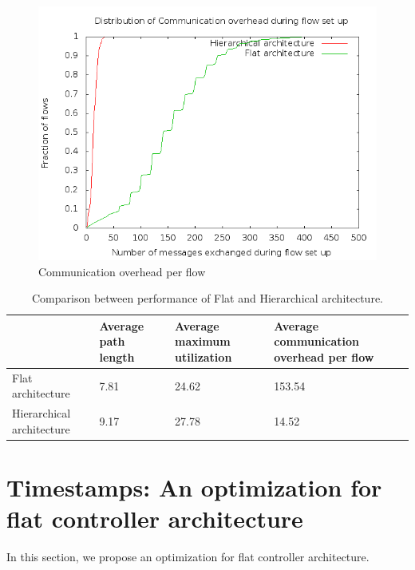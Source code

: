 \documentclass[10pt, twocolumn]{article}
\begin{document}
\begin{figure}[h]
\includegraphics[scale=0.3]{msg}
\caption{Communication overhead per flow}
\label{fig:msg}
\end{figure}


\begin{table}
\centering
\begin{tabular}{| L{4cm} | L{2cm} | L{3cm} | L{4cm} |}
\hline
& {Average path length} & {Average maximum utilization} & {Average communication overhead per flow} \\ \hline
Flat architecture & 7.81 & 24.62 & 153.54 \\ \hline
Hierarchical architecture & 9.17 & 27.78 & 14.52 \\ \hline
\end{tabular}
\caption{Comparison between performance of Flat and Hierarchical architecture.}
\end{table}%



\section{Timestamps: An optimization for flat controller architecture}
\label{sec:timestamps}
In this section, we propose an optimization for flat controller architecture. 
\end{document}
